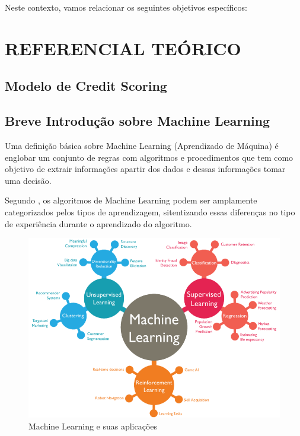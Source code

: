 \documentclass[
	12pt,				%
	openright,			%
	oneside,      %
	a4paper,			%
	english,			%
	french,				%
	spanish,			%
	brazil,				%
	]{abntex2}\usepackage[]{graphicx}\usepackage[]{xcolor}
\begin{document}
Neste contexto, vamos relacionar os seguintes objetivos específicos:






\chapter{REFERENCIAL TEÓRICO}


  \section{Modelo de Credit Scoring}
  
  
  
  
  \section{Breve Introdução sobre Machine Learning}
  
Uma definição básica sobre Machine Learning (Aprendizado de Máquina) é englobar 
um conjunto de regras com algoritmos e procedimentos que tem como objetivo de 
extrair informações apartir dos dados e dessas informações tomar uma decisão.

Segundo \cite{goodfellow2016deep}, os algoritmos de Machine Learning podem ser 
amplamente categorizados pelos tipos de aprendizagem, sitentizando essas diferenças
no tipo de experiência durante o aprendizado do algoritmo.

    \begin{figure}
      \caption{\label{img1}Machine Learning e suas aplicações}
      \begin{center}
        \includegraphics[scale = 0.4]{image/img1.png}
      \end{center}
    \end{figure}
  
\end{document}
